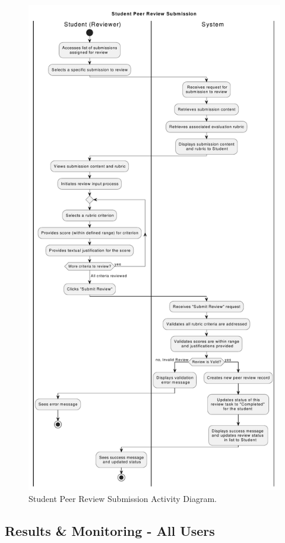 \begin{figure}[h]
    \centering
    \includegraphics[width=.75\linewidth]{SRS/imgs/5_StudentPeerReviewCreation.pdf}
    \caption{Student Peer Review Submission Activity Diagram.}
    \label{fig:StudentPeerReviewAD}
\end{figure}
\vspace*{\fill}
\clearpage

\vspace*{2cm}

\subsection{Results \& Monitoring - All Users}

